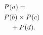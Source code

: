 \documentclass{article}
\begin{document}
\begin{eqnarray*}
\lefteqn{P(a)=}\\
&\lefteqn{P(b) \times P(c)}\\
&&\mbox{}+ P(d).
\end{eqnarray*}
\end{document}
